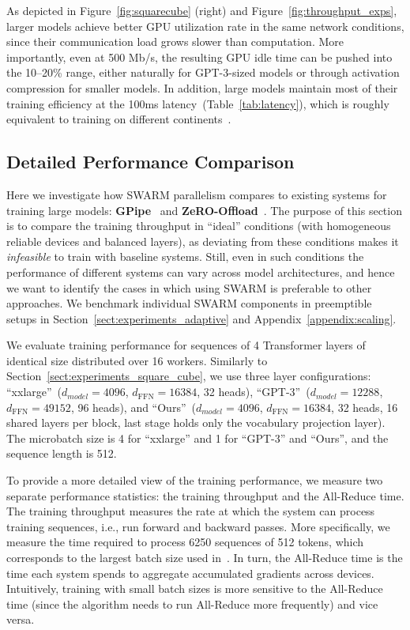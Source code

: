 As depicted in Figure~\ref{fig:squarecube} (right) and Figure~\ref{fig:throughput_exps}, larger models achieve better GPU utilization rate in the same network conditions, since their communication load grows slower than computation. More importantly, even at 500 Mb/s, the resulting GPU idle time can be pushed into the 10--20\% range, either naturally for GPT-3-sized models or through activation compression for smaller models. In addition, large models maintain most of their training efficiency at the 100ms latency~(Table~\ref{tab:latency}), which is roughly equivalent to training on different continents~\citep{verizon_latency}.

\vspace{-4pt}
\subsection{Detailed Performance Comparison}\label{appendix:training_throughput}

Here we investigate how SWARM parallelism compares to existing systems for training large models: \textbf{GPipe}~\citep{huang2019gpipe} and \textbf{ZeRO-Offload}~\citep{zerooffload}.
The purpose of this section is to compare the training throughput in ``ideal'' conditions (with homogeneous reliable devices and balanced layers), as deviating from these conditions makes it \textit{infeasible} to train with baseline systems.
Still, even in such conditions the performance of different systems can vary across model architectures, and hence we want to identify the cases in which using SWARM is preferable to other approaches.
We benchmark individual SWARM components in preemptible setups in Section~\ref{sect:experiments_adaptive} and Appendix~\ref{appendix:scaling}.

We evaluate training performance for sequences of 4 Transformer layers of identical size distributed over 16 workers. Similarly to Section~\ref{sect:experiments_square_cube}, we use three layer configurations: ``xxlarge''~($d_{model} {=} 4096$, $d_{\text{FFN}} {=} 16384$, 32 heads), ``GPT-3''~($d_{model} {=} 12288$, $d_{\text{FFN}} {=} 49152$, 96 heads), and ``Ours''~($d_{model} {=} 4096$, $d_{\text{FFN}} {=} 16384$, 32 heads, 16 shared layers per block, last stage holds only the vocabulary projection layer). The microbatch size is 4 for ``xxlarge'' and 1 for ``GPT-3'' and ``Ours'', and the sequence length is 512.

To provide a more detailed view of the training performance, we measure two separate performance statistics: the training throughput and the All-Reduce time. 
The training throughput measures the rate at which the system can process training sequences, i.e., run forward and backward passes. 
More specifically, we measure the time required to process 6250 sequences of 512 tokens, which corresponds to the largest batch size used in~\citet{gpt3}.
In turn, the All-Reduce time is the time each system spends to aggregate accumulated gradients across devices. 
Intuitively, training with small batch sizes is more sensitive to the All-Reduce time (since the algorithm needs to run All-Reduce more frequently) and vice versa.



